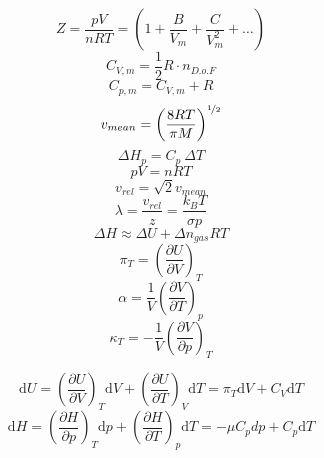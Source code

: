 \documentclass[12pt, letterpaper]{memoir}
\begin{document}
\begin{minipage}{0.5\linewidth}
	\begin{equation*}
		Z=\dfrac{pV}{nRT}=\left(1+\dfrac{B}{V_m} + \dfrac{C}{V_m^2}+\ldots\right)
	\end{equation*}	
	\begin{equation*}
		C_{V,m} = \dfrac{1}{2}R\cdot n_{D.o.F}
	\end{equation*}
	\begin{equation*}
		C_{p,m} = C_{V,m}+R
	\end{equation*}	
	\begin{equation*}
		v_{mean} = \left(\frac{8RT}{\pi M}\right)^{\nicefrac{1}{2}}
	\end{equation*}
	\begin{equation*}
		\Delta H_p= C_p~\Delta T
	\end{equation*}	
	\begin{equation*}
		pV=nRT
	\end{equation*}
	\begin{equation*}
		v_{rel} = \sqrt{2}v_{mean}
	\end{equation*}
	\begin{equation*}
		\lambda = \dfrac{v_{rel}}{z}=\frac{k_BT}{\sigma p}
	\end{equation*}
	\begin{equation*}
		\Delta H \approx \Delta U + \Delta n_{gas}RT
	\end{equation*}
	\begin{equation*}
		\pi_T=\left(\frac{\partial U}{\partial V}\right)_{\!\!T}
	\end{equation*}
	\begin{equation*}
		\alpha=\frac{1}{V}\left(\dfrac{\partial V}{\partial T}\right)_{\!\!p}
	\end{equation*}
	\begin{equation*}
		\kappa_T=-\frac{1}{V}\left(\dfrac{\partial V}{\partial p}\right)_{\!\!T}
	\end{equation*}
\end{minipage}
\begin{equation*}
	\mathrm{d}U=\left(\dfrac{\partial U}{\partial V}\right)_{\!\!T}\mathrm{d}V + \left(\dfrac{\partial U}{\partial T}\right)_{\!\!V}\mathrm{d}T=\pi_T\mathrm{d}V + C_V\mathrm{d}T
\end{equation*}
\begin{equation*}
	\mathrm{d}H=\left(\dfrac{\partial H}{\partial p}\right)_{\!\!T}\mathrm{d}p + \left(\dfrac{\partial H}{\partial T}\right)_{\!\!p}\mathrm{d}T=-\mu C_p{d}p + C_p\mathrm{d}T
\end{equation*}

\newpage



\newpage
\end{document}
